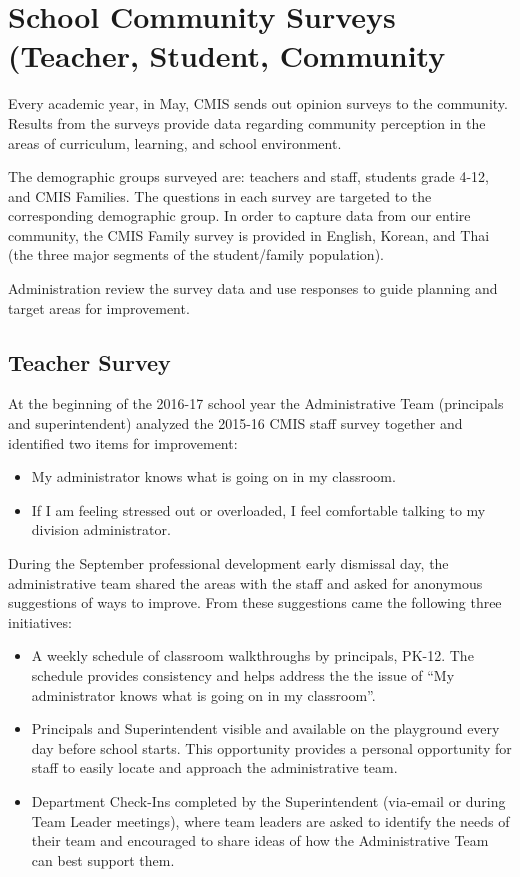 \section{School Community Surveys (Teacher, Student, Community}

Every academic year, in May, CMIS sends out opinion surveys to the community.  Results from the surveys provide data regarding community perception in the areas of curriculum, learning, and school environment. 

The demographic groups surveyed are: teachers and staff, students grade 4-12, and CMIS Families. The questions in each survey are targeted to the corresponding demographic group. In order to capture data from our entire community, the CMIS Family survey is provided in English, Korean, and Thai (the three major segments of the student/family population).

Administration review the survey data and use responses to guide planning and target areas for improvement.

\subsection{Teacher Survey}

At the beginning of the 2016-17 school year the Administrative Team (principals and superintendent) analyzed the 2015-16 CMIS staff survey together and identified two items for improvement:
\begin{itemize}
\item My administrator knows what is going on in my classroom.
\item If I am feeling stressed out or overloaded, I feel comfortable talking to my division administrator. 
\end{itemize}


During the September professional development early dismissal day, the administrative team shared the areas with the staff and asked for anonymous suggestions of ways to improve. From these suggestions came the following three initiatives:
\begin{itemize}
\item A weekly schedule of classroom walkthroughs by principals, PK-12.  The schedule provides consistency and helps address the the issue of “My administrator knows what is going on in my classroom”.
\item Principals and Superintendent visible and available on the playground every day before school starts.  This opportunity provides a personal opportunity for staff to easily locate and approach the administrative team.
\item Department Check-Ins completed by the Superintendent (via-email or during Team Leader meetings), where team leaders are asked to identify the needs of their team and encouraged to share ideas of how the Administrative Team can best support them.
\end{itemize}


